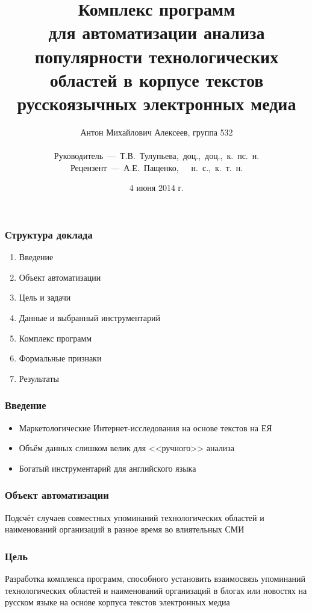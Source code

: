 \documentclass{beamer}
\title{Комплекс программ \\для автоматизации анализа популярности технологических 
областей в корпусе текстов русскоязычных электронных медиа}
\author{{\small Антон Михайлович Алексеев, группа 532\\~\\ Руководитель~---~Т.В.~Тулупьева,~доц.,~доц.,~к.~пс.~н. \\ Рецензент~---~А.Е.~Пащенко,~~~н.~с.,~к.~т.~н.}}
\institute{Санкт-Петербургский государственный университет\\Математико-механический факультет\\ Кафедра информатики}
\date{4 июня 2014 г.}
\let\otp\titlepage
\renewcommand{\titlepage}{\otp\addtocounter{framenumber}{-1}}
\begin{document}

{
\frame{\titlepage}
}

\begin{frame}\frametitle{Структура доклада}
    \begin{enumerate}
        \item Введение
        \item Объект автоматизации
        \item Цель и задачи
        \item Данные и выбранный инструментарий
        \item Комплекс программ
        \item Формальные признаки
        \item Результаты
    \end{enumerate}
\end{frame}

\begin{frame}\frametitle{Введение}

\begin{itemize}
\item Маркетологические Интернет-исследования на основе текстов на ЕЯ
\item Объём данных слишком велик для <<ручного>> анализа
\item Богатый инструментарий для английского языка
\end{itemize}

\end{frame}

\begin{frame}\frametitle{Объект автоматизации}
Подсчёт случаев совместных упоминаний технологических областей и наименований организаций в разное время во влиятельных СМИ
\end{frame}

\begin{frame}\frametitle{Цель}
Разработка комплекса программ, способного установить взаимосвязь упоминаний технологических областей и наименований 
организаций в блогах или новостях на русском языке на основе корпуса текстов электронных медиа 
\end{frame}
\end{document}

